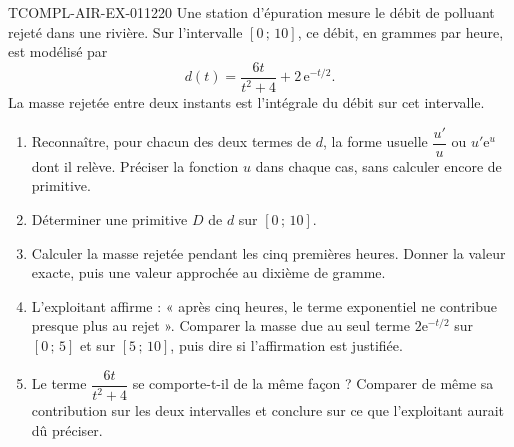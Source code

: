 \begin{exercice}{TCOMPL-AIR-EX-011}{2}{20}
Une station d'épuration mesure le débit de polluant rejeté dans une rivière. Sur
l'intervalle $[0\,;\,10]$, ce débit, en grammes par heure, est modélisé par
\[
  d(t)=\dfrac{6t}{t^2+4}+2\,\mathrm{e}^{-t/2}.
\]
La masse rejetée entre deux instants est l'intégrale du débit sur cet intervalle.
\begin{enumerate}
  \item Reconnaître, pour chacun des deux termes de $d$, la forme usuelle
    $\dfrac{u'}{u}$ ou $u'\mathrm{e}^{u}$ dont il relève. Préciser la fonction $u$
    dans chaque cas, sans calculer encore de primitive.
  \item Déterminer une primitive $D$ de $d$ sur $[0\,;\,10]$.
  \item Calculer la masse rejetée pendant les cinq premières heures. Donner la
    valeur exacte, puis une valeur approchée au dixième de gramme.
  \item L'exploitant affirme : « après cinq heures, le terme exponentiel ne
    contribue presque plus au rejet ». Comparer la masse due au seul terme
    $2\mathrm{e}^{-t/2}$ sur $[0\,;\,5]$ et sur $[5\,;\,10]$, puis dire si
    l'affirmation est justifiée.
  \item Le terme $\dfrac{6t}{t^2+4}$ se comporte-t-il de la même façon ? Comparer
    de même sa contribution sur les deux intervalles et conclure sur ce que
    l'exploitant aurait dû préciser.
\end{enumerate}
\end{exercice}
